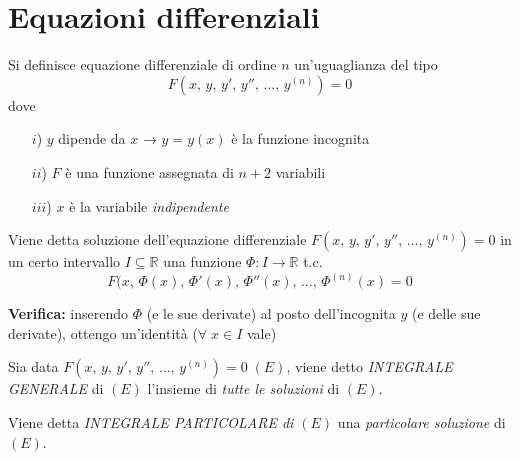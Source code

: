 \section{Equazioni differenziali}

\begin{definition}
    Si definisce equazione differenziale di ordine $n$ un’uguaglianza del tipo
    \begin{equation}
        \boxed{F(x, \, y, \, y', \, y'', \, \dotsc, \, y^{(n)}) =  0} 
    \end{equation}
    dove 

    \begin{itemize}[noitemsep,topsep=0pt]
        \item [$i$)] $y$ dipende da $x$ → $y = y(x)$ è la funzione incognita
        \item [$ii$)]$F$ è una funzione assegnata di $n + 2$ variabili
        \item [$iii$)] $x$ è la variabile \emph{indipendente}
    \end{itemize}
\end{definition}

\begin{definition}
    Viene detta soluzione dell’equazione differenziale $F(x, \, y, \, y', \, y'', \, \dotsc, \, y^{(n)}) =  0$ in un certo intervallo $I \subseteq \mathbb{R}$ una funzione $\varPhi : I \to \mathbb{R}$ t.c.
    \begin{equation}
        \boxed{F(x, \, \varPhi(x), \, \varPhi'(x), \, \varPhi''(x), \, \dotsc, \, \varPhi^{(n)}(x) = 0}
    \end{equation}
\end{definition}


\textbf{Verifica:} inserendo $\varPhi$ (e le sue derivate) al posto dell’incognita $y$ (e delle sue derivate), ottengo un’identità ($\forall \; x \in I$ vale)

\begin{definition}
    Sia data $F(x, \, y, \, y', \, y'', \, \dotsc, \, y^{(n)}) =  0 \; (E)$, viene detto \emph{INTEGRALE GENERALE} di $(E)$ l’insieme di \emph{tutte le soluzioni} di $(E)$. 

Viene detta \emph{INTEGRALE PARTICOLARE di $(E)$} una \emph{particolare soluzione} di $(E)$.
\end{definition}

